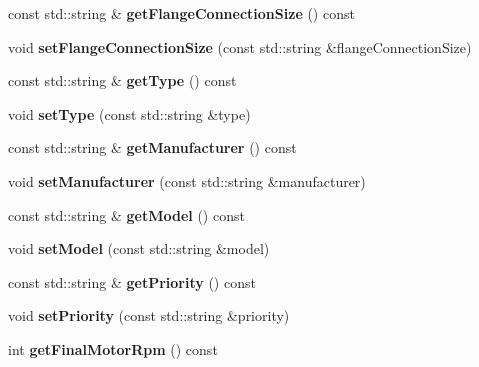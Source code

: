 \begin{DoxyCompactItemize}
\mbox{\label{class_pump_data_affad2c16ca53f4c6710f7b343ed03922}} 
const std\+::string \& {\bfseries get\+Flange\+Connection\+Size} () const
\item 
\mbox{\label{class_pump_data_a4e3c5e1307a5a94f26ecd822c7273a95}} 
void {\bfseries set\+Flange\+Connection\+Size} (const std\+::string \&flange\+Connection\+Size)
\item 
\mbox{\label{class_pump_data_a6f23d4c1f3790a840b86bf31f88d4542}} 
const std\+::string \& {\bfseries get\+Type} () const
\item 
\mbox{\label{class_pump_data_a147302e2849bfac57d08c3e98c62e2fa}} 
void {\bfseries set\+Type} (const std\+::string \&type)
\item 
\mbox{\label{class_pump_data_ad0bed5b66c1a15d2cf8f836f90a8e413}} 
const std\+::string \& {\bfseries get\+Manufacturer} () const
\item 
\mbox{\label{class_pump_data_a8d41cfbffb88ed36f2d069edb5ae5e65}} 
void {\bfseries set\+Manufacturer} (const std\+::string \&manufacturer)
\item 
\mbox{\label{class_pump_data_a59a058fa6e9c9b5bfbfdf806f132d465}} 
const std\+::string \& {\bfseries get\+Model} () const
\item 
\mbox{\label{class_pump_data_a9ab5980c78d786c363e583ce371c297a}} 
void {\bfseries set\+Model} (const std\+::string \&model)
\item 
\mbox{\label{class_pump_data_ab3aedad47e64fc143327d3331099e726}} 
const std\+::string \& {\bfseries get\+Priority} () const
\item 
\mbox{\label{class_pump_data_aea2420ebfa204d0bbda6f322729c11c3}} 
void {\bfseries set\+Priority} (const std\+::string \&priority)
\item 
\mbox{\label{class_pump_data_ace9256fdd3afebb9f2f8647234f7f9af}} 
int {\bfseries get\+Final\+Motor\+Rpm} () const
\item 

\end{DoxyCompactItemize}
